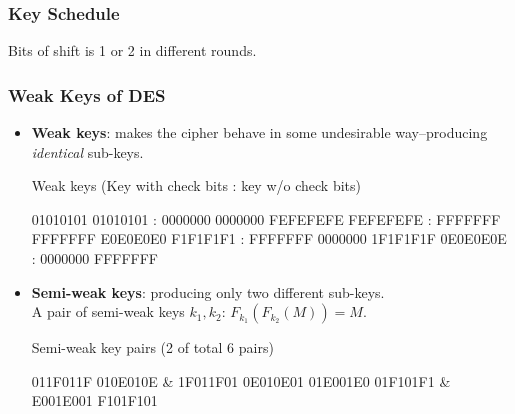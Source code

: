 \begin{frame}\frametitle{Key Schedule}
\begin{figure}
\begin{center}

\end{center}
\end{figure}
Bits of shift is 1 or 2 in different rounds.
\end{frame}
\begin{frame}[fragile]\frametitle{Weak Keys of DES}
\begin{itemize}
\item \textbf{Weak keys}: makes the cipher behave in some undesirable way--producing \emph{identical} sub-keys.
\begin{exampleblock}{Weak keys (Key with check bits : key w/o check bits)}
\begin{semiverbatim}	
01010101 01010101  :  0000000 0000000
FEFEFEFE FEFEFEFE  :  FFFFFFF FFFFFFF
E0E0E0E0 F1F1F1F1  :  FFFFFFF 0000000
1F1F1F1F 0E0E0E0E  :  0000000 FFFFFFF
\end{semiverbatim}
\end{exampleblock}
\item \textbf{Semi-weak keys}: producing only two different sub-keys.\\ A pair of semi-weak keys $k_1, k_2$: $F_{k_1}(F_{k_2}(M))=M$.
\begin{exampleblock}{Semi-weak key pairs (2 of total 6 pairs)}
\begin{semiverbatim}	
011F011F 010E010E  &  1F011F01 0E010E01
01E001E0 01F101F1  &  E001E001 F101F101
\end{semiverbatim}
\end{exampleblock}
\end{itemize}
\end{frame}

